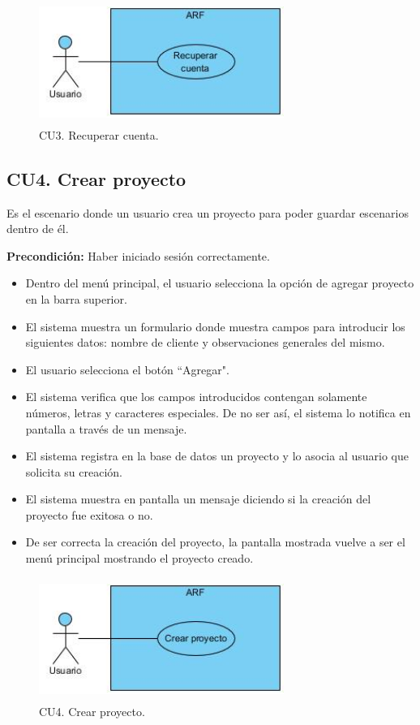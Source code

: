 \begin{figure}[!htbp]
	\centering
	\includegraphics[width=8cm,height=4cm]{imagenes/analisis/cu/recuperar_cuenta.jpg}
	\caption{CU3. Recuperar cuenta.}
	\label{fig:recuperarcuenta}
\end{figure} 

\subsection{CU4. Crear proyecto}\par
Es el escenario donde un usuario crea un proyecto para poder guardar escenarios dentro de él.\par
\textbf{Precondición:} Haber iniciado sesión correctamente.\par
\begin{itemize}
	\item Dentro del menú principal, el usuario selecciona la opción de agregar proyecto en la barra superior.
	\item El sistema muestra un formulario donde muestra campos para introducir los siguientes datos: nombre de cliente y observaciones generales del mismo.
	\item El usuario selecciona el botón ``Agregar".
	\item El sistema verifica que los campos introducidos contengan solamente números, letras y caracteres especiales. De no ser así, el sistema lo notifica en pantalla a través de un mensaje.
	\item El sistema registra en la base de datos un proyecto y lo asocia al usuario que solicita su creación.
	\item El sistema muestra en pantalla un mensaje diciendo si la creación del proyecto fue exitosa o no.
	\item De ser correcta la creación del proyecto, la pantalla mostrada vuelve a ser el menú principal mostrando el proyecto creado.
\end{itemize}

\begin{figure}[!htbp]
	\centering
	\includegraphics[width=8cm,height=4cm]{imagenes/analisis/cu/crear_proyecto.jpg}
	\caption{CU4. Crear proyecto.}
	\label{fig:crearproyecto}
\end{figure} 

